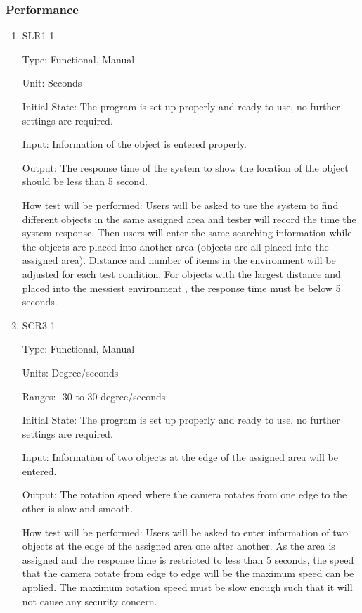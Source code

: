 \documentclass[12pt, titlepage]{article}
\begin{document}
\subsubsection{Performance}
\begin{enumerate}


\item{SLR1-1\\}

Type: Functional, Manual

Unit: Seconds
					
Initial State: The program is set up properly and ready to use, no further settings are required.
					
Input: Information of the object is entered properly.
					
Output: The response time of the system to show the location of the object should be less than 5 second.
					
How test will be performed: Users will be asked to use the system to find different objects in the same assigned area and tester will record the time the system response. Then users will enter the same searching information while the objects are placed into another area (objects are all placed into the assigned area). Distance and number of items in the environment will be adjusted for each test condition. For objects with the largest distance and placed into the messiest environment , the response time must be below 5 seconds.



\item{SCR3-1\\}

Type: Functional, Manual

Units: Degree/seconds

Ranges: -30 to 30 degree/seconds
					
Initial State: The program is set up properly and ready to use, no further settings are required.
					
Input: Information of two objects at the edge of the assigned area will be entered.
					
Output: The rotation speed where the camera rotates from one edge to the other is slow and smooth.
					
How test will be performed: Users will be asked to enter information of two objects at the edge of the assigned area one after another. As the area is assigned and the response time is restricted to less than 5 seconds, the speed that the camera rotate from edge to edge will be the maximum speed can be applied. The maximum rotation speed must be slow enough such that it will not 
cause any security concern.


\end{enumerate}
\end{document}
